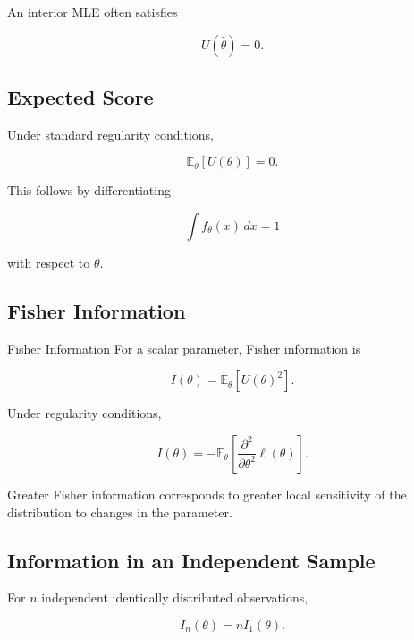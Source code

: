 An interior MLE often satisfies

\[
\boxed{
U(\widehat{\theta})=0.
}
\]

\subsection{Expected Score}
\label{subsec:expected-score}

Under standard regularity conditions,

\[
\boxed{
\mathbb{E}_\theta
[
U(\theta)
]
=
0.
}
\]

This follows by differentiating

\[
\int
f_\theta(x)\,dx
=
1
\]

with respect to \(\theta\).

\subsection{Fisher Information}
\label{subsec:fisher-information}

\begin{definitionbox}{Fisher Information}
For a scalar parameter, Fisher information is

\[
\boxed{
I(\theta)
=
\mathbb{E}_\theta
[
U(\theta)^2
].
}
\]
\end{definitionbox}

Under regularity conditions,

\[
\boxed{
I(\theta)
=
-
\mathbb{E}_\theta
\left[
\frac{
\partial^2
}{
\partial\theta^2
}
\ell(\theta)
\right].
}
\]

Greater Fisher information corresponds to greater local sensitivity of
the distribution to changes in the parameter.

\subsection{Information in an Independent Sample}
\label{subsec:fisher-information-independent-sample}

For \(n\) independent identically distributed observations,

\[
\boxed{
I_n(\theta)
=
nI_1(\theta).
}
\]

